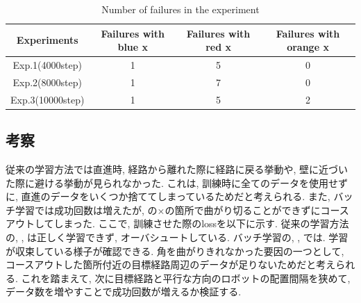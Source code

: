 \begin{table}[h]
  \centering
  \begin{tabular}{|c|c|c|c|} \hline
    Experiments & Failures with blue x & Failures with red x & Failures with orange x\\ \hline
    Exp.1(4000step) & 1 & 5 & 0 \\ \hline
    Exp.2(8000step) & 1 & 7 & 0 \\ \hline
    Exp.3(10000step) & 1 & 5 & 2 \\ \hline
  \end{tabular}
  \caption{Number of failures in the experiment}
  \label{tb:fail1.2}
\end{table}

\newpage
\subsection{考察}
従来の学習方法では直進時, 経路から離れた際に経路に戻る挙動や, 壁に近づいた際に避ける挙動が見られなかった. これは, 訓練時に全てのデータを使用せずに, 直進のデータをいくつか捨ててしまっているためだと考えられる. また, バッチ学習では成功回数は増えたが, の×の箇所で曲がり切ることができずにコースアウトしてしまった. ここで, 訓練させた際のlossを以下に示す. 従来の学習方法の, , は正しく学習できず, オーバシュートしている. バッチ学習の, , では. 学習が収束している様子が確認できる. 角を曲がりきれなかった要因の一つとして, コースアウトした箇所付近の目標経路周辺のデータが足りないためだと考えられる. これを踏まえて, 次に目標経路と平行な方向のロボットの配置間隔を狭めて, データ数を増やすことで成功回数が増えるか検証する. 

